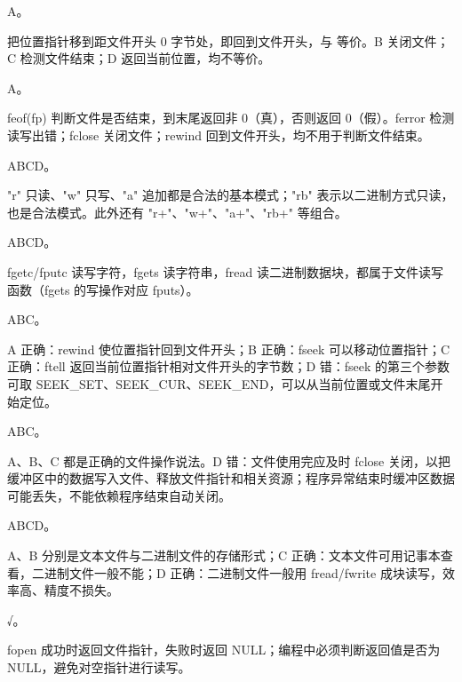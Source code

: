 \documentclass[a4paper,11pt]{article}
\begin{document}
\q A。\begin{analysis} 把位置指针移到距文件开头 0 字节处，即回到文件开头，与  等价。B 关闭文件；C 检测文件结束；D 返回当前位置，均不等价。\end{analysis}

\q A。\begin{analysis}feof(fp) 判断文件是否结束，到末尾返回非 0（真），否则返回 0（假）。ferror 检测读写出错；fclose 关闭文件；rewind 回到文件开头，均不用于判断文件结束。\end{analysis}


\q ABCD。\begin{analysis}"r" 只读、"w" 只写、"a" 追加都是合法的基本模式；"rb" 表示以二进制方式只读，也是合法模式。此外还有 "r+"、"w+"、"a+"、"rb+" 等组合。\end{analysis}

\q ABCD。\begin{analysis}fgetc/fputc 读写字符，fgets 读字符串，fread 读二进制数据块，都属于文件读写函数（fgets 的写操作对应 fputs）。\end{analysis}

\q ABC。\begin{analysis}A 正确：rewind 使位置指针回到文件开头；B 正确：fseek 可以移动位置指针；C 正确：ftell 返回当前位置指针相对文件开头的字节数；D 错：fseek 的第三个参数可取 SEEK_SET、SEEK_CUR、SEEK_END，可以从当前位置或文件末尾开始定位。\end{analysis}

\q ABC。\begin{analysis}A、B、C 都是正确的文件操作说法。D 错：文件使用完应及时 fclose 关闭，以把缓冲区中的数据写入文件、释放文件指针和相关资源；程序异常结束时缓冲区数据可能丢失，不能依赖程序结束自动关闭。\end{analysis}

\q ABCD。\begin{analysis}A、B 分别是文本文件与二进制文件的存储形式；C 正确：文本文件可用记事本查看，二进制文件一般不能；D 正确：二进制文件一般用 fread/fwrite 成块读写，效率高、精度不损失。\end{analysis}


\q √。\begin{analysis}fopen 成功时返回文件指针，失败时返回 NULL；编程中必须判断返回值是否为 NULL，避免对空指针进行读写。\end{analysis}
\end{document}
